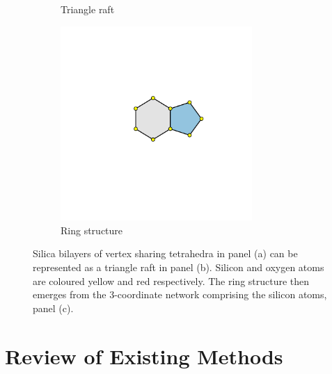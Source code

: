 \begin{figure}[bt]
\begin{subfigure}[b]{0.3\textwidth}
         \caption{Triangle raft}
         \label{fig:bilayer2}
     \end{subfigure}
     \hfill
     \begin{subfigure}[b]{0.3\textwidth}
         \centering
         \includegraphics[width=0.8\textwidth]{./figures/bilayers/mx2_bilayer_3.pdf}
         \vspace{5mm}
         \caption{Ring structure}
         \label{fig:bilayer3}
     \end{subfigure}
     \hfill
     
     \caption{Silica bilayers of vertex sharing tetrahedra in panel (a) can be represented as a \td{} triangle raft in panel (b). Silicon and oxygen atoms are coloured yellow and red respectively. The ring structure then emerges from the 3\--coordinate network comprising the silicon atoms, panel (c).}
     \label{fig:bilayer}
\end{figure}

\section{Review of Existing Methods}
\label{s:triraftexisting}

